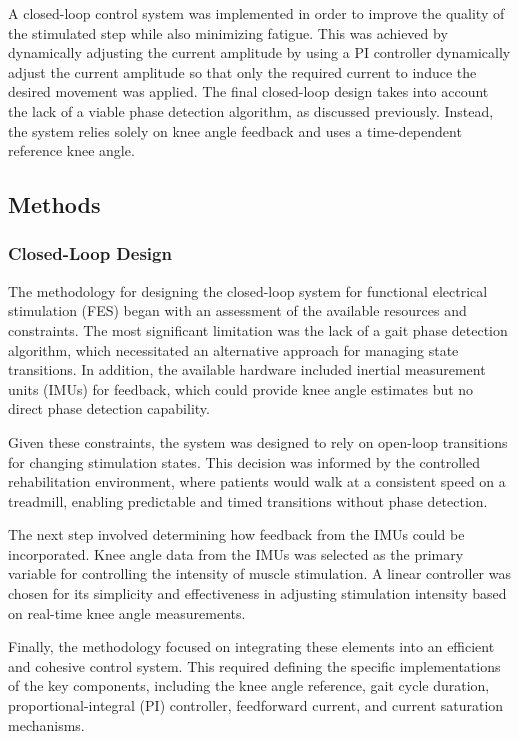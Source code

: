 
A closed-loop control system was implemented in order to improve the quality of the stimulated step while also minimizing fatigue. This was achieved by dynamically adjusting the current amplitude by using a  PI controller dynamically adjust the current amplitude so that only the required current to induce the desired movement was applied. The final closed-loop design takes into account the lack of a viable phase detection algorithm, as discussed previously. Instead, the system relies solely on knee angle feedback and uses a time-dependent reference knee angle.

\subsection{Methods}
\subsubsection{Closed-Loop Design}
The methodology for designing the closed-loop system for functional electrical stimulation (FES) began with an assessment of the available resources and constraints. The most significant limitation was the lack of a gait phase detection algorithm, which necessitated an alternative approach for managing state transitions. In addition, the available hardware included inertial measurement units (IMUs) for feedback, which could provide knee angle estimates but no direct phase detection capability.

Given these constraints, the system was designed to rely on open-loop transitions for changing stimulation states. This decision was informed by the controlled rehabilitation environment, where patients would walk at a consistent speed on a treadmill, enabling predictable and timed transitions without phase detection.

The next step involved determining how feedback from the IMUs could be incorporated. Knee angle data from the IMUs was selected as the primary variable for controlling the intensity of muscle stimulation. A linear controller was chosen for its simplicity and effectiveness in adjusting stimulation intensity based on real-time knee angle measurements.

Finally, the methodology focused on integrating these elements into an efficient and cohesive control system. This required defining the specific implementations of the key components, including the knee angle reference, gait cycle duration, proportional-integral (PI) controller, feedforward current, and current saturation mechanisms.

